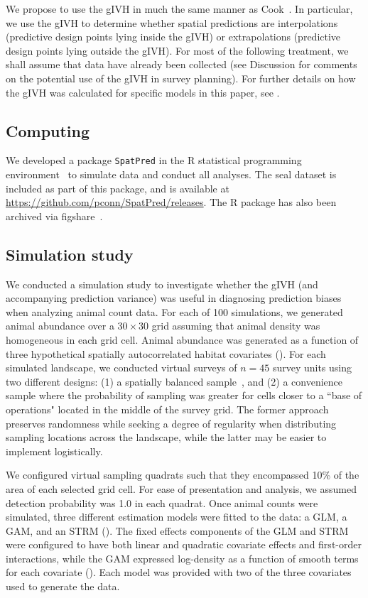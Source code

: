 \documentclass[10pt,letterpaper]{article}
\begin{document}
We propose to use the gIVH in much the same manner as Cook~\cite{1979}.  In particular, we use the gIVH to determine whether spatial predictions are interpolations (predictive design points lying inside the gIVH) or extrapolations (predictive design points lying outside the gIVH).  For most of the following treatment, we shall assume that data have already been collected (see Discussion for comments on the potential use of the gIVH in survey planning).  For further details on how the gIVH was calculated for specific models in this paper, see .

\subsection*{Computing}

We developed a package \texttt{SpatPred} in the R statistical programming environment~\cite{RTeam2012} to simulate data and conduct all analyses.  The seal dataset is included as part of this package, and is available at \url{https://github.com/pconn/SpatPred/releases}.  The R package has also been archived via figshare~\cite{Conn2015}.

\subsection*{Simulation study}

We conducted a simulation study to investigate whether the gIVH (and accompanying prediction variance) was useful in diagnosing prediction biases when analyzing animal count data. For each of 100 simulations, we generated animal abundance over a $30 \times 30$ grid assuming that animal density was homogeneous in each grid cell.  Animal abundance was generated as a function of three hypothetical spatially autocorrelated habitat covariates ().   For each simulated landscape, we conducted virtual surveys of $n=45$ survey units using two different designs: (1) a spatially balanced sample~\cite{StevensOlsen2004}, and (2) a convenience sample where the probability of sampling was greater for cells closer to a ``base of operations" located in the middle of the survey grid. The former approach preserves randomness while seeking a degree of regularity when distributing sampling locations across the landscape, while the latter may be easier to implement logistically.

We configured virtual sampling quadrats such that they encompassed 10\% of the area of each selected grid cell.  For ease of presentation and analysis, we assumed detection probability was 1.0 in each quadrat.  Once animal counts were simulated, three different estimation models were fitted to the data: a GLM, a GAM, and an STRM ().  The fixed effects components of the GLM and STRM were configured to have both linear and quadratic covariate effects and first-order interactions, while the GAM expressed log-density as a function of smooth terms for each covariate ().  Each model was provided with two of the three covariates used to generate the data.
\end{document}
